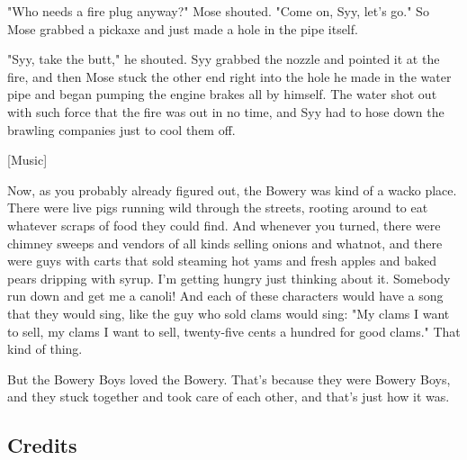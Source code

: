 "Who needs a fire plug anyway?" Mose shouted. "Come on, Syy, let's go." So Mose grabbed a pickaxe and just made a hole in the pipe itself.

"Syy, take the butt," he shouted. Syy grabbed the nozzle and pointed it at the fire, and then Mose stuck the other end right into the hole he made in the water pipe and began pumping the engine brakes all by himself. The water shot out with such force that the fire was out in no time, and Syy had to hose down the brawling companies just to cool them off.

    [Music]

Now, as you probably already figured out, the Bowery was kind of a wacko place. There were live pigs running wild through the streets, rooting around to eat whatever scraps of food they could find. And whenever you turned, there were chimney sweeps and vendors of all kinds selling onions and whatnot, and there were guys with carts that sold steaming hot yams and fresh apples and baked pears dripping with syrup. I'm getting hungry just thinking about it. Somebody run down and get me a canoli! And each of these characters would have a song that they would sing, like the guy who sold clams would sing: "My clams I want to sell, my clams I want to sell, twenty-five cents a hundred for good clams." That kind of thing.

But the Bowery Boys loved the Bowery. That's because they were Bowery Boys, and they stuck together and took care of each other, and that's just how it was.

\subsection{Credits}